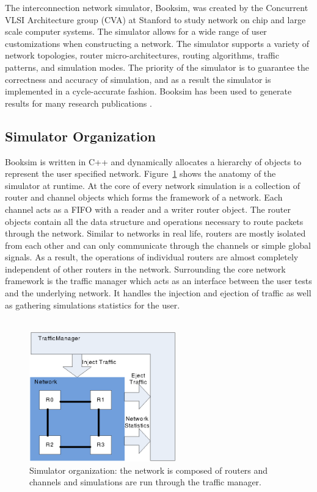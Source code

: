
The interconnection network simulator, Booksim, was created by the Concurrent VLSI Architecture group (CVA) at Stanford to study network on chip and large scale computer systems. The simulator allows for a wide range of user customizations when constructing a network. The simulator supports a variety of network topologies, router micro-architectures, routing algorithms, traffic patterns, and simulation modes. The priority of the simulator is  to guarantee the correctness and accuracy of simulation, and as a result the simulator is implemented in a cycle-accurate fashion. Booksim has been used to generate results for many research publications \cite{cdragon,KimISCA07,PPIN}. 
\subsection{Simulator Organization}
Booksim is written in C++ and dynamically allocates a hierarchy of objects to represent the user specified network. Figure~\ref{fig:simulator} shows the anatomy of the simulator at runtime. At the core of every network simulation is a collection of router and channel objects which forms the framework of a network. Each channel acts as a FIFO with a reader and a writer router object. The router objects contain all the data structure and operations necessary to route packets through the network. Similar to networks in real life, routers are mostly isolated from each other and can only communicate through the channels or simple global signals. As a result, the operations of individual routers are almost completely independent of other routers in the network. Surrounding the core network framework is the traffic manager which acts as an interface between the user tests and the underlying network. It handles the injection and ejection of traffic as well as gathering simulations statistics for the user. \\
~\\
\begin{figure}[t]
\centering
\includegraphics[width=2.5in]{simulator.eps}
\caption{Simulator organization: the network is composed of routers and channels and simulations are run through the traffic manager. }
\label{fig:simulator}
\end{figure}
